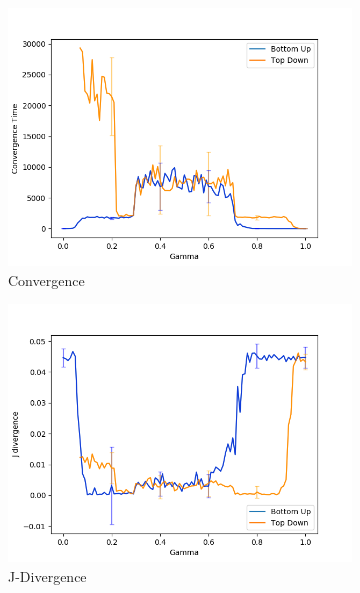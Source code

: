 \begin{figure}[H]
 \centering
  \begin{subfigure}[ht]{0.45\textwidth}
    \includegraphics[width=\textwidth]{Images/Figures/BU+TD/None/Convergence_best.png}
    \caption{Convergence}\label{fig:convergence}
 \end{subfigure}
 \hfill
 \begin{subfigure}[ht]{0.45\textwidth}
    \includegraphics[width=\textwidth]{Images/Figures/BU+TD/None/J-Div_best.png}
    \caption{J-Divergence}\label{fig:J-Div_convergence}
 \end{subfigure}
 \hfill
 \begin{subfigure}[ht]{0.45\textwidth}

\end{subfigure}
\end{figure}
